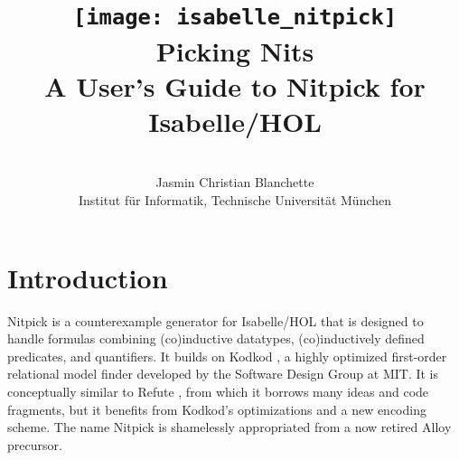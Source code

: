 \documentclass[a4paper,12pt]{article}
\begin{document}

\title{\texttt{[image: isabelle\_nitpick]} \\[4ex]
Picking Nits \\[\smallskipamount]
\Large A User's Guide to Nitpick for Isabelle/HOL}
\author{\hbox{} \\
Jasmin Christian Blanchette \\
{\normalsize Institut f\"ur Informatik, Technische Universit\"at M\"unchen} \\
\hbox{}}

\maketitle

\tableofcontents

\setlength{\parskip}{.7em plus .2em minus .1em}
\setlength{\parindent}{0pt}
\setlength{\abovedisplayskip}{\parskip}
\setlength{\abovedisplayshortskip}{.9\parskip}
\setlength{\belowdisplayskip}{\parskip}
\setlength{\belowdisplayshortskip}{.9\parskip}

\newenvironment{enum}%
    {\begin{list}{}{%
        \setlength{\topsep}{.1\parskip}%
        \setlength{\partopsep}{.1\parskip}%
        \setlength{\itemsep}{\parskip}%
        \advance\itemsep by-\parsep}}
    {\end{list}}

\def\pre{\begingroup\vskip0pt plus1ex\advance\leftskip by\leftmargin
\advance\rightskip by\leftmargin}
\def\post{\vskip0pt plus1ex\endgroup}

\def\prew{\pre\advance\rightskip by-\leftmargin}
\def\postw{\post}

\section{Introduction}
\label{introduction}

Nitpick \cite{blanchette-nipkow-2009} is a counterexample generator for
Isabelle/HOL \cite{isa-tutorial} that is designed to handle formulas
combining (co)in\-duc\-tive datatypes, (co)in\-duc\-tively defined predicates, and
quantifiers. It builds on Kodkod \cite{torlak-jackson-2007}, a highly optimized
first-order relational model finder developed by the Software Design Group at
MIT. It is conceptually similar to Refute \cite{weber-2008}, from which it
borrows many ideas and code fragments, but it benefits from Kodkod's
optimizations and a new encoding scheme. The name Nitpick is shamelessly
appropriated from a now retired Alloy precursor.
\end{document}
